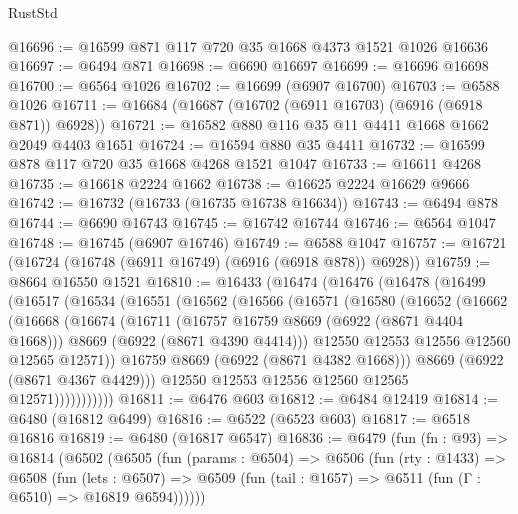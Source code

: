\begin{lexlean}{RustStd}
\begin{coremodule}
@16696 := @16599 @871 @117 @720 @35 @1668 @4373 @1521 @1026 @16636
@16697 := @6494 @871
@16698 := @6690 @16697
@16699 := @16696 @16698
@16700 := @6564 @1026
@16702 := @16699 (@6907 @16700)
@16703 := @6588 @1026
@16711 := @16684 (@16687 (@16702 (@6911 @16703) (@6916 (@6918 @871)) @6928))
@16721 := @16582 @880 @116 @35 @11 @4411 @1668 @1662 @2049 @4403 @1651
@16724 := @16594 @880 @35 @4411
@16732 := @16599 @878 @117 @720 @35 @1668 @4268 @1521 @1047
@16733 := @16611 @4268
@16735 := @16618 @2224 @1662
@16738 := @16625 @2224 @16629 @9666
@16742 := @16732 (@16733 (@16735 @16738 @16634))
@16743 := @6494 @878
@16744 := @6690 @16743
@16745 := @16742 @16744
@16746 := @6564 @1047
@16748 := @16745 (@6907 @16746)
@16749 := @6588 @1047
@16757 := @16721 (@16724 (@16748 (@6911 @16749) (@6916 (@6918 @878)) @6928))
@16759 := @8664 @16550 @1521
@16810 := @16433
    (@16474
      (@16476
        (@16478
          (@16499
            (@16517
              (@16534
                (@16551
                  (@16562
                    (@16566
                      (@16571
                        (@16580
                          (@16652
                            (@16662
                              (@16668
                                (@16674
                                  (@16711
                                    (@16757 @16759 @8669 (@6922 (@8671 @4404 @1668)))
                                    @8669
                                    (@6922 (@8671 @4390 @4414)))
                                  @12550
                                  @12553
                                  @12556
                                  @12560
                                  @12565
                                  @12571))
                              @16759
                              @8669
                              (@6922 (@8671 @4382 @1668)))
                            @8669
                            (@6922 (@8671 @4367 @4429)))
                          @12550
                          @12553
                          @12556
                          @12560
                          @12565
                          @12571)))))))))))
@16811 := @6476 @603
@16812 := @6484 @12419
@16814 := @6480 (@16812 @6499)
@16816 := @6522 (@6523 @603)
@16817 := @6518 @16816
@16819 := @6480 (@16817 @6547)
@16836 := @6479
    (fun (fn : @93) =>
    @16814
      (@6502
        (@6505
          (fun (params : @6504) =>
          @6506
            (fun (rty : @1433) =>
            @6508
              (fun (lets : @6507) =>
              @6509 (fun (tail : @1657) => @6511 (fun (Γ : @6510) => @16819 @6594))))))

\end{coremodule}
\end{lexlean}
